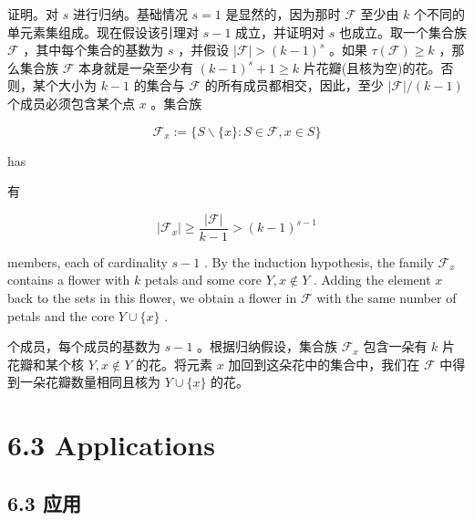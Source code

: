 \documentclass[10pt]{article}
\begin{document}
\begin{tcolorbox}\relax
证明。对 \(s\) 进行归纳。基础情况 \(s = 1\) 是显然的，因为那时 \(\mathcal{F}\) 至少由 \(k\) 个不同的单元素集组成。现在假设该引理对 \(s - 1\) 成立，并证明对 \(s\) 也成立。取一个集合族 \(\mathcal{F}\) ，其中每个集合的基数为 \(s\) ，并假设 \(\left| \mathcal{F}\right|  > {\left( k - 1\right) }^{s}\) 。如果 \(\tau \left( \mathcal{F}\right)  \geq  k\) ，那么集合族 \(\mathcal{F}\) 本身就是一朵至少有 \({\left( k - 1\right) }^{s} + 1 \geq  k\) 片花瓣(且核为空)的花。否则，某个大小为 \(k - 1\) 的集合与 \(\mathcal{F}\) 的所有成员都相交，因此，至少 \(\left| \mathcal{F}\right| /\left( {k - 1}\right)\) 个成员必须包含某个点 \(x\) 。集合族
\end{tcolorbox}

\[
{\mathcal{F}}_{x} \mathrel{\text{ := }} \{ S \smallsetminus  \{ x\}  : S \in  \mathcal{F},x \in  S\}
\]

has

\begin{tcolorbox}\relax
有
\end{tcolorbox}

\[
\left| {\mathcal{F}}_{x}\right|  \geq  \frac{\left| \mathcal{F}\right| }{k - 1} > {\left( k - 1\right) }^{s - 1}
\]

members, each of cardinality \(s - 1\) . By the induction hypothesis, the family \({\mathcal{F}}_{x}\) contains a flower with \(k\) petals and some core \(Y,x \notin  Y\) . Adding the element \(x\) back to the sets in this flower, we obtain a flower in \(\mathcal{F}\) with the same number of petals and the core \(Y \cup  \{ x\}\) .

\begin{tcolorbox}\relax
个成员，每个成员的基数为 \(s - 1\) 。根据归纳假设，集合族 \({\mathcal{F}}_{x}\) 包含一朵有 \(k\) 片花瓣和某个核 \(Y,x \notin  Y\) 的花。将元素 \(x\) 加回到这朵花中的集合中，我们在 \(\mathcal{F}\) 中得到一朵花瓣数量相同且核为 \(Y \cup  \{ x\}\) 的花。
\end{tcolorbox}

\section*{6.3 Applications}

\begin{tcolorbox}\relax
\section*{6.3 应用}
\end{tcolorbox}
\end{document}
